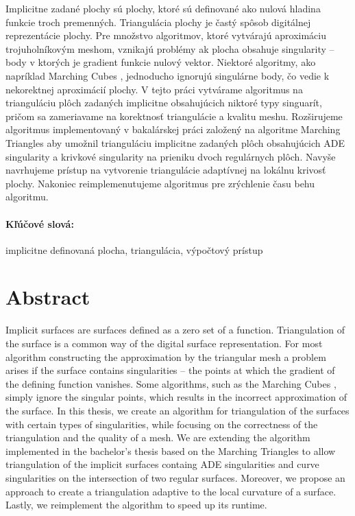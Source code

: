 \documentclass[12pt, twoside]{book}
\begin{document}
Implicitne zadané plochy sú plochy, ktoré sú definované ako nulová hladina
funkcie troch premenných. Triangulácia plochy je častý spôsob digitálnej reprezentácie
plochy.
Pre množstvo algoritmov, ktoré vytvárajú aproximáciu trojuholníkovým meshom,
vznikajú problémy ak plocha obsahuje singularity -- body v ktorých je gradient funkcie
nulový vektor.
Niektoré algoritmy, ako napríklad Marching Cubes \cite{lorensen1987marching},
jednoducho ignorujú singulárne body, čo vedie k nekorektnej aproximácií plochy.
V tejto práci vytvárame algoritmus na trianguláciu plôch zadaných implicitne
obsahujúcich niktoré typy singuarít, pričom sa zameriavame na korektnosť
triangulácie a kvalitu meshu.
Rozširujeme algoritmus implementovaný v bakalárskej práci \cite{korecova2021triangulation}
založený na algoritme Marching Triangles \cite{hilton1996marching}
aby umožnil trianguláciu implicitne zadaných plôch obsahujúcich 
ADE singularity a krivkové singularity na prieniku dvoch regulárnych plôch.
Navyše navrhujeme prístup na vytvorenie triangulácie adaptívnej na 
lokálnu krivosť plochy. Nakoniec reimplemenutujeme algoritmus 
\cite{korecova2021triangulation} pre zrýchlenie času behu algoritmu.
\paragraph*{Kľúčové slová:} implicitne definovaná plocha, triangulácia, výpočtový prístup



\newpage 
\section*{Abstract}
Implicit surfaces are surfaces defined as a zero set of a function.
Triangulation of the surface is a common way of the digital surface
representation.
For most algorithm constructing the approximation by the triangular mesh
a problem arises if the surface contains singularities -- the points at which 
the gradient of the defining function vanishes.
Some algorithms, such as the Marching Cubes \cite{lorensen1987marching},
simply ignore the singular points, which results in the incorrect approximation
of the surface.
In this thesis, we create an algorithm for triangulation of 
the surfaces with certain types of singularities, while focusing on the
correctness of the triangulation and the quality of a mesh.
We are extending the algorithm implemented in the bachelor's thesis 
\cite{korecova2021triangulation}
based on the Marching Triangles \cite{hilton1996marching} to allow 
triangulation of the implicit surfaces containg ADE singularities
and curve singularities on the intersection of two regular surfaces.
Moreover, we propose an approach to create a triangulation adaptive 
to the local curvature of a surface. Lastly, we reimplement the 
algorithm \cite{korecova2021triangulation} to speed up its runtime.
\end{document}
